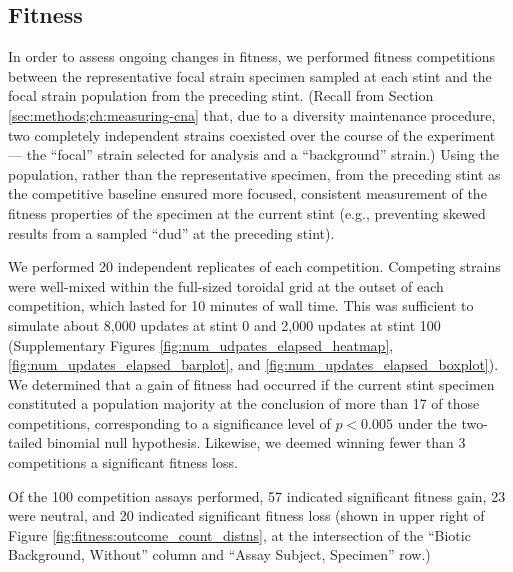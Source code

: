 
\subsection{Fitness}

% 

In order to assess ongoing changes in fitness, we performed fitness competitions between the representative focal strain specimen sampled at each stint and the focal strain population from the preceding stint.
(Recall from Section \ref{sec:methods;ch:measuring-cna} that, due to a diversity maintenance procedure, two completely independent strains coexisted over the course of the experiment --- the ``focal'' strain selected for analysis and a ``background'' strain.)
Using the population, rather than the representative specimen, from the preceding stint as the competitive baseline ensured more focused, consistent measurement of the fitness properties of the specimen at the current stint (e.g., preventing skewed results from a sampled ``dud'' at the preceding stint).

We performed 20 independent replicates of each competition.
Competing strains were well-mixed within the full-sized toroidal grid at the outset of each competition, which lasted for 10 minutes of wall time.
This was sufficient to simulate about 8,000 updates at stint 0 and 2,000 updates at stint 100 (Supplementary Figures \ref{fig:num_udpates_elapsed_heatmap}, \ref{fig:num_updates_elapsed_barplot}, and \ref{fig:num_updates_elapsed_boxplot}).
We determined that a gain of fitness had occurred if the current stint specimen constituted a population majority at the conclusion of more than 17 of those competitions, corresponding to a significance level of $p < 0.005$ under the two-tailed binomial null hypothesis.
Likewise, we deemed winning fewer than 3 competitions a significant fitness loss.



Of the 100 competition assays performed, 57 indicated significant fitness gain, 23 were neutral, and 20 indicated significant fitness loss (shown in upper right of Figure \ref{fig:fitness:outcome_count_distns}, at the intersection of the ``Biotic Background, Without'' column and ``Assay Subject, Specimen'' row.)


